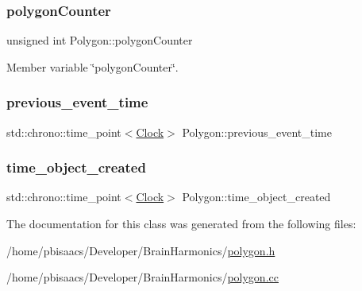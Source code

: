 \subsubsection{\texorpdfstring{polygon\+Counter}{polygonCounter}}
{\footnotesize\ttfamily unsigned int Polygon\+::polygon\+Counter\hspace{0.3cm}{\ttfamily [private]}}



Member variable \char`\"{}polygon\+Counter\char`\"{}. 

\mbox{\label{classPolygon_a46fa35a90ffcf375c8eceb2cf8a169d0}} 
\subsubsection{\texorpdfstring{previous\+\_\+event\+\_\+time}{previous\_event\_time}}
{\footnotesize\ttfamily std\+::chrono\+::time\+\_\+point$<$\mbox{\hyperlink{universe_8h_a0ef8d951d1ca5ab3cfaf7ab4c7a6fd80}{Clock}}$>$ Polygon\+::previous\+\_\+event\+\_\+time\hspace{0.3cm}{\ttfamily [private]}}

\mbox{\label{classPolygon_af5b19b47f12f4984521d6f48a45c1428}} 
\subsubsection{\texorpdfstring{time\+\_\+object\+\_\+created}{time\_object\_created}}
{\footnotesize\ttfamily std\+::chrono\+::time\+\_\+point$<$\mbox{\hyperlink{universe_8h_a0ef8d951d1ca5ab3cfaf7ab4c7a6fd80}{Clock}}$>$ Polygon\+::time\+\_\+object\+\_\+created\hspace{0.3cm}{\ttfamily [private]}}



The documentation for this class was generated from the following files\+:\begin{DoxyCompactItemize}
\item 
/home/pbisaacs/\+Developer/\+Brain\+Harmonics/\mbox{\hyperlink{polygon_8h}{polygon.\+h}}\item 
/home/pbisaacs/\+Developer/\+Brain\+Harmonics/\mbox{\hyperlink{polygon_8cc}{polygon.\+cc}}\end{DoxyCompactItemize}
